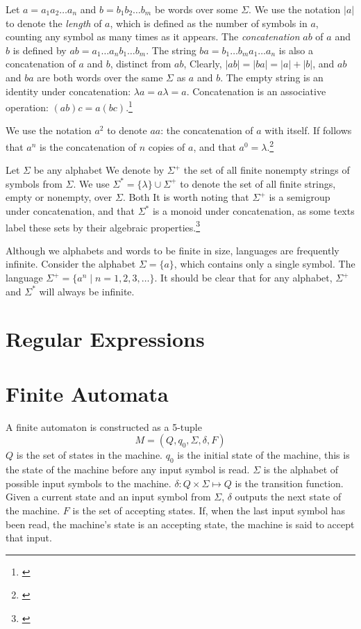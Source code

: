\documentclass{bcthesis}
\newcommand{\footcite}[2]{\footnote{\cite[pg.~{#2}]{#1}}}
\begin{document}
		Let $a = a_1 a_2 \dots a_n$ and $b = b_1 b_2 \dots b_m$ be words over some $\Sigma$. 
		We use the notation $|a|$ to denote the \textit{length} of $a$, which is defined as the number of symbols in $a$, counting any symbol as many times as it appears.
		The \textit{concatenation} $ab$ of $a$ and $b$ is defined by $ab = a_1 \dots a_n b_1 \dots b_m$.
		The string $ba = b_1 \dots b_m a_1 \dots a_n$ is also a concatenation of $a$ and $b$, distinct from $ab$,
		Clearly, $|ab| = |ba| = |a| + |b|$, and $ab$ and $ba$ are both words over the same $\Sigma$ as $a$ and $b$.
		The empty string is an identity under concatenation: $\lambda a = a \lambda = a$.
		Concatenation is an associative operation: $(ab)c = a(bc)$.\footcite{lemmings}{1-3}

		We use the notation $a^2$ to denote $aa$: the concatenation of $a$ with itself. 
		If follows that $a^n$ is the concatenation of $n$ copies of $a$, and that $a^0 = \lambda$.\footcite{salomaa}{1}

		Let $\Sigma$ be any alphabet
		We denote by $\Sigma^+$ the set of all finite nonempty strings of symbols from $\Sigma$. 
		We use $\Sigma^* = \{ \lambda \} \cup \Sigma^+$ to denote the set of all finite strings, empty or nonempty, over $\Sigma$.
		Both 
		It is worth noting that $\Sigma^+$ is a semigroup under concatenation, and that $\Sigma^*$ is a monoid under concatenation, as some texts label these sets by their algebraic properties.\footcite{salomaa}{1}

		Although we alphabets and words to be finite in size, languages are frequently infinite.
		Consider the alphabet $\Sigma = \{ a \}$, which contains only a single symbol.
		The language $\Sigma^+ = \{ a^n \mid n = 1, 2, 3, \dots \}$.
		It should be clear that for any alphabet, $\Sigma^+$ and $\Sigma^*$ will always be infinite.







	\section{Regular Expressions} %
	\label{sec:regular_expressions}
		

	\section{Finite Automata} %
	\label{sec:finite_automata}
		A finite automaton is constructed as a 5-tuple
		\[
			M = (Q, q_0, \Sigma, \delta, F)
		\]
		$Q$ is the set of states in the machine.
		$q_0$ is the initial state of the machine, this is the state of the machine before any input symbol is read.
		$\Sigma$ is the alphabet of possible input symbols to the machine.
		$\delta: Q \times \Sigma \mapsto Q$ is the transition function.
		Given a current state and an input symbol from $\Sigma$, $\delta$ outputs the next state of the machine.
		$F$ is the set of accepting states.
		If, when the last input symbol has been read, the machine's state is an accepting state, the machine is said to accept that input.
\end{document}
